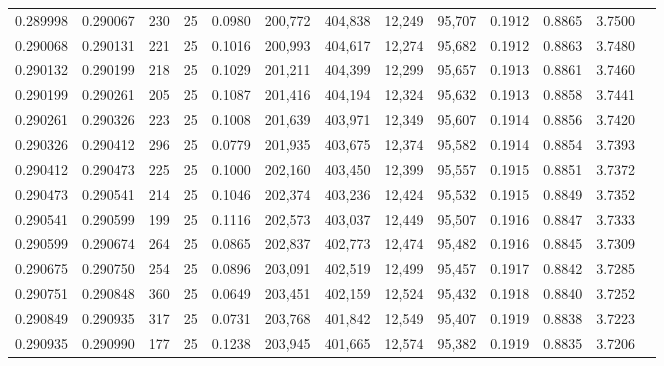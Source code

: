 \begin{tabular}{rrrrrrrrrrrrr}
0.289998 & 0.290067 &   230 &  25 &                                     0.0980 & 200,772 & 404,838 &  12,249 &  95,707 & 0.1912 & 0.8865 & 3.7500 \\
0.290068 & 0.290131 &   221 &  25 &                                     0.1016 & 200,993 & 404,617 &  12,274 &  95,682 & 0.1912 & 0.8863 & 3.7480 \\
0.290132 & 0.290199 &   218 &  25 &                                     0.1029 & 201,211 & 404,399 &  12,299 &  95,657 & 0.1913 & 0.8861 & 3.7460 \\
0.290199 & 0.290261 &   205 &  25 &                                     0.1087 & 201,416 & 404,194 &  12,324 &  95,632 & 0.1913 & 0.8858 & 3.7441 \\
0.290261 & 0.290326 &   223 &  25 &                                     0.1008 & 201,639 & 403,971 &  12,349 &  95,607 & 0.1914 & 0.8856 & 3.7420 \\
0.290326 & 0.290412 &   296 &  25 &                                     0.0779 & 201,935 & 403,675 &  12,374 &  95,582 & 0.1914 & 0.8854 & 3.7393 \\
0.290412 & 0.290473 &   225 &  25 &                                     0.1000 & 202,160 & 403,450 &  12,399 &  95,557 & 0.1915 & 0.8851 & 3.7372 \\
0.290473 & 0.290541 &   214 &  25 &                                     0.1046 & 202,374 & 403,236 &  12,424 &  95,532 & 0.1915 & 0.8849 & 3.7352 \\
0.290541 & 0.290599 &   199 &  25 &                                     0.1116 & 202,573 & 403,037 &  12,449 &  95,507 & 0.1916 & 0.8847 & 3.7333 \\
0.290599 & 0.290674 &   264 &  25 &                                     0.0865 & 202,837 & 402,773 &  12,474 &  95,482 & 0.1916 & 0.8845 & 3.7309 \\
0.290675 & 0.290750 &   254 &  25 &                                     0.0896 & 203,091 & 402,519 &  12,499 &  95,457 & 0.1917 & 0.8842 & 3.7285 \\
0.290751 & 0.290848 &   360 &  25 &                                     0.0649 & 203,451 & 402,159 &  12,524 &  95,432 & 0.1918 & 0.8840 & 3.7252 \\
0.290849 & 0.290935 &   317 &  25 &                                     0.0731 & 203,768 & 401,842 &  12,549 &  95,407 & 0.1919 & 0.8838 & 3.7223 \\
0.290935 & 0.290990 &   177 &  25 &                                     0.1238 & 203,945 & 401,665 &  12,574 &  95,382 & 0.1919 & 0.8835 & 3.7206 \\

\end{tabular}
